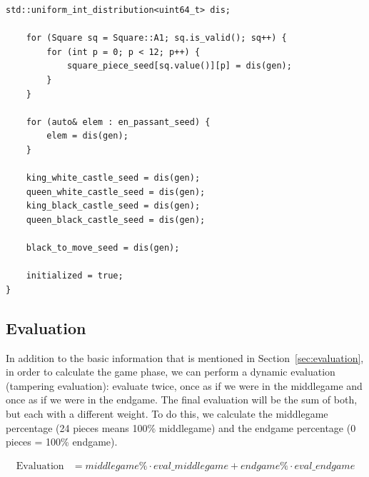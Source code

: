 \begin{itemize}
\begin{lstlisting}[breaklines=true, frame=single, caption={Initialization of seeds}]
    std::uniform_int_distribution<uint64_t> dis;

    for (Square sq = Square::A1; sq.is_valid(); sq++) {
        for (int p = 0; p < 12; p++) {
            square_piece_seed[sq.value()][p] = dis(gen);
        }
    }

    for (auto& elem : en_passant_seed) {
        elem = dis(gen);
    }

    king_white_castle_seed = dis(gen);
    queen_white_castle_seed = dis(gen);
    king_black_castle_seed = dis(gen);
    queen_black_castle_seed = dis(gen);

    black_to_move_seed = dis(gen);

    initialized = true;
}
\end{lstlisting}

\end{itemize}

\subsection{Evaluation}

In addition to the basic information that is mentioned in Section~\ref{sec:evaluation}, in order to calculate the game phase, we can perform a dynamic evaluation (tampering evaluation): evaluate twice, once as if we were in the middlegame and once as if we were in the endgame. The final evaluation will be the sum of both, but each with a different weight. To do this, we calculate the middlegame percentage (24 pieces means 100\% middlegame) and the endgame percentage (0 pieces = 100\% endgame).

\begin{align*}
\text{Evaluation} &= middlegame\% \cdot eval\_middlegame + endgame\% \cdot eval\_endgame
\end{align*}

\vspace{1em}

